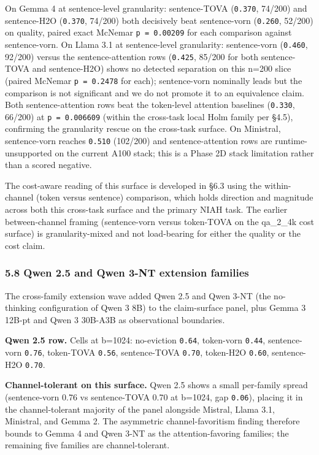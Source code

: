 \documentclass[
]{article}
\begin{document}
On Gemma 4 at sentence-level granularity: sentence-TOVA
(\texttt{0.370}, 74/200) and sentence-H2O (\texttt{0.370}, 74/200)
both decisively beat sentence-vorn (\texttt{0.260}, 52/200) on quality,
paired exact McNemar \texttt{p\ =\ 0.00209} for each comparison against
sentence-vorn. On Llama 3.1 at sentence-level granularity: sentence-vorn
(\texttt{0.460}, 92/200) versus the sentence-attention rows
(\texttt{0.425}, 85/200 for both sentence-TOVA and
sentence-H2O) shows no detected separation on this n=200 slice
(paired McNemar \texttt{p\ =\ 0.2478} for each); sentence-vorn nominally
leads but the comparison is not significant and we do not promote it to
an equivalence claim. Both sentence-attention rows beat the token-level
attention baselines (\texttt{0.330}, 66/200) at \texttt{p\ =\ 0.006609}
(within the cross-task local Holm family per §4.5), confirming the
granularity rescue on the cross-task surface. On Ministral,
sentence-vorn reaches \texttt{0.510} (102/200) and sentence-attention
rows are runtime-unsupported on the current A100 stack; this is a Phase
2D stack limitation rather than a scored negative.

The cost-aware reading of this surface is developed in §6.3 using the
within-channel (token versus sentence) comparison, which holds direction
and magnitude across both this cross-task surface and the primary NIAH
task. The earlier between-channel framing (sentence-vorn versus
token-TOVA on the qa\_2\_4k cost surface) is granularity-mixed and
not load-bearing for either the quality or the cost claim.

\subsubsection{5.8 Qwen 2.5 and Qwen 3-NT extension
families}\label{58-qwen-25-7b-inverts-the-channel-favoritism-axis}

The cross-family extension wave added Qwen 2.5 and Qwen 3-NT (the
no-thinking configuration of Qwen 3 8B) to the claim-surface panel,
plus Gemma 3 12B-pt and Qwen 3 30B-A3B as observational boundaries.

\textbf{Qwen 2.5 row.} Cells at b=1024: no-eviction \texttt{0.64},
token-vorn \texttt{0.44}, sentence-vorn \texttt{0.76}, token-TOVA
\texttt{0.56}, sentence-TOVA \texttt{0.70}, token-H2O \texttt{0.60},
sentence-H2O \texttt{0.70}.

\textbf{Channel-tolerant on this surface.} Qwen 2.5 shows a small
per-family spread (sentence-vorn 0.76 vs sentence-TOVA 0.70 at b=1024,
gap \texttt{0.06}), placing it in the channel-tolerant majority of the
panel alongside Mistral, Llama 3.1, Ministral, and Gemma 2. The
asymmetric channel-favoritism finding therefore bounds to Gemma 4 and
Qwen 3-NT as the attention-favoring families; the remaining five
families are channel-tolerant.
\end{document}
